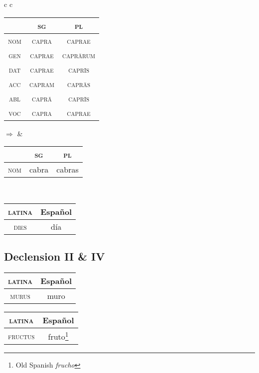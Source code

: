 \documentclass{report}
\begin{document}
\begin{tabular}{c c}
  \begin{tabular}{|c|c|c|}
    \hline
    & \textsc{sg} & \textsc{pl} \\
    \hline
    \textsc{nom} & \textsc{capra }& \textsc{caprae} \\
    \hline
    \textsc{gen} & \textsc{caprae} & \textsc{capr\={a}rum} \\
    \hline
    \textsc{dat} & \textsc{caprae} & \textsc{capr\={i}s} \\
    \hline
    \textsc{acc} & \cellcolor{gray} \textsc{capram} & \cellcolor{magenta} \textsc{capr\={a}s} \\
    \hline
    \textsc{abl} & \textsc{capr\={a}} & \textsc{capr\={i}s} \\
    \hline
    \textsc{voc} & \textsc{capra} & \textsc{caprae} \\
    \hline
  \end{tabular} \quad $\Rightarrow$ &

  \begin{tabular}{|c|c|c|}
    \hline
    & \textsc{sg} & \textsc{pl} \\
    \hline
    \textsc{nom} & \cellcolor{gray} cabra & \cellcolor{magenta} cabras \\
    \hline
  \end{tabular} \\
\end{tabular}

\begin{tabular}{|c|c|}
  \hline
  \textsc{latina} & Español \\
  \hline
  \textsc{dies} & día \\
  \hline
\end{tabular}

\subsection{Declension II \& IV}

\begin{tabular}{|c|c|}
  \hline
  \textsc{latina} & Español \\
  \hline
  \textsc{murus} & muro \\
  \hline
\end{tabular}

\begin{tabular}{|c|c|}
  \hline
  \textsc{latina} & Español \\
  \hline
  \textsc{fructus} & fruto\footnote{Old Spanish \emph{frucho}} \\
  \hline
\end{tabular}
\end{document}
